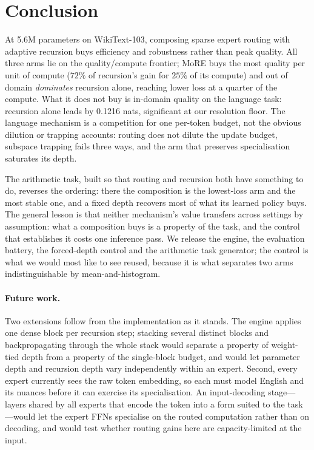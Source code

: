 \section{Conclusion}
\label{sec:conclusion}

At 5.6M parameters on WikiText-103, composing sparse expert routing with
adaptive recursion buys efficiency and robustness rather than peak quality. All
three arms lie on the quality/compute frontier; MoRE buys the most quality per
unit of compute ($72\%$ of recursion's gain for $25\%$ of its compute) and out of
domain \emph{dominates} recursion alone, reaching lower loss at a quarter of the
compute. What it does not buy is in-domain quality on the language
task: recursion alone leads by 0.1216 nats, significant at our resolution floor.
The language mechanism is a competition for one per-token budget, not the obvious
dilution or trapping accounts: routing does not dilute the update budget,
subspace trapping fails three ways, and the arm that preserves specialisation
saturates its depth.

The arithmetic task, built so that routing and recursion both have something to
do, reverses the ordering: there the composition is the lowest-loss arm and the
most stable one, and a fixed depth recovers most of what its learned policy buys.
The general lesson is that neither mechanism's value transfers across settings by
assumption: what a composition buys is a property of the task, and the control
that establishes it costs one inference pass. We release the engine, the
evaluation battery, the forced-depth control and the arithmetic task generator;
the control is what we would most like to see reused, because it is what
separates two arms indistinguishable by mean-and-histogram.

\paragraph{Future work.} Two extensions follow from the implementation as it
stands. The engine applies one dense block per recursion step; stacking several
distinct blocks and backpropagating through the whole stack would separate a
property of weight-tied depth from a property of the single-block budget, and
would let parameter depth and recursion depth vary independently within an
expert. Second, every expert currently sees the raw token embedding, so each must
model English and its nuances before it can exercise its specialisation. An
input-decoding stage---layers shared by all experts that encode the token into a
form suited to the task---would let the expert FFNs specialise on the routed
computation rather than on decoding, and would test whether routing gains here
are capacity-limited at the input.
